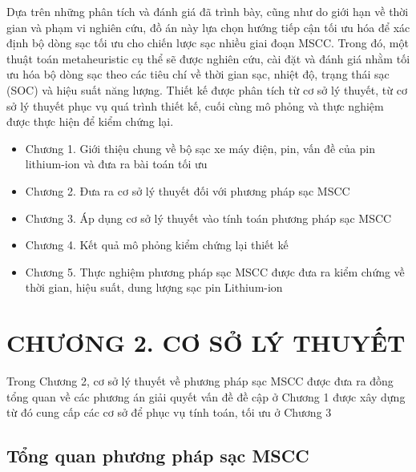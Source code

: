 \documentclass{thesis}
\begin{document}
Dựa trên những phân tích và đánh giá đã trình bày, cũng như do giới hạn về thời gian và phạm vi nghiên cứu, đồ án này lựa chọn hướng tiếp cận tối ưu hóa để xác định bộ dòng sạc tối ưu cho chiến lược sạc nhiều giai đoạn MSCC. Trong đó, một thuật toán metaheuristic cụ thể sẽ được nghiên cứu, cài đặt và đánh giá nhằm tối ưu hóa bộ dòng sạc theo các tiêu chí về thời gian sạc, nhiệt độ, trạng thái sạc (SOC) và hiệu suất năng lượng. Thiết kế được phân tích từ cơ sở lý thuyết, từ cơ sở lý thuyết phục vụ quá trình thiết kế, cuối cùng mô phỏng và thực nghiệm được thực hiện để kiểm chứng lại.

\begin{itemize}
    \item Chương 1. Giới thiệu chung về bộ sạc xe máy điện, pin, vấn đề của pin lithium-ion và đưa ra bài toán tối ưu
    \item Chương 2. Đưa ra cơ sở lý thuyết đối với phương pháp sạc MSCC
    \item Chương 3. Áp dụng cơ sở lý thuyết vào tính toán phương pháp sạc MSCC
    \item Chương 4. Kết quả mô phỏng kiểm chứng lại thiết kế
    \item Chương 5. Thực nghiệm phương pháp sạc MSCC được đưa ra kiểm chứng về thời gian, hiệu suất, dung lượng sạc pin Lithium-ion
\end{itemize}



\newpage
\section*{CHƯƠNG 2. CƠ SỞ LÝ THUYẾT}

\setcounter{section}{2}
    \setcounter{subsection}{0}
        \setcounter{figure}{0}
            \setcounter{table}{0}

 Trong Chương 2, cơ sở lý thuyết về phương pháp sạc MSCC được đưa ra
 đồng tổng quan về các phương án giải quyết vấn đề đề cập ở Chương 1 được xây dựng từ đó cung cấp các cơ sở để phục vụ tính toán, tối ưu ở Chương 3

\subsection{Tổng quan phương pháp sạc MSCC}
\end{document}
